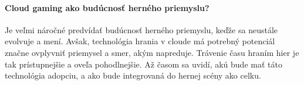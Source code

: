 \documentclass[10pt,twoside,slovak,a4paper]{article}
\begin{document}
\paragraph{Cloud gaming ako budúcnosť herného priemyslu?} Je veľmi náročné predvídať budúcnosť herného priemyslu, keďže sa neustále evolvuje a mení. Avšak, technológia hrania v cloude má potrebný potenciál značne ovplyvniť priemysel a smer, akým napreduje. Trávenie času hraním hier je tak prístupnejšie a oveľa pohodlnejšie. Až časom sa uvidí, akú bude mať táto technológia adopciu, a ako bude integrovaná do hernej scény ako celku. \cite{7182690}





\end{document}
